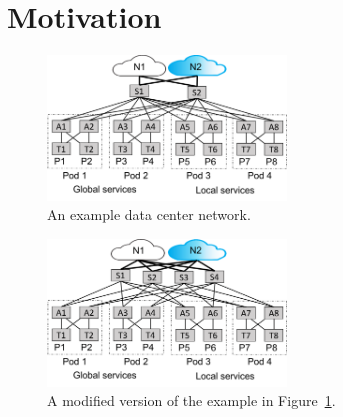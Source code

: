 \documentclass[numbers, 10pt, preprint]{sigplanconf}
\begin{document}




\section{Motivation}
\label{sec:motivation}


\begin{figure}[t!]
  \centering
  \includegraphics[width=2.5in]{figures/example}
  \vspace{-.8em}
  \caption{An example data center network.}
  \label{fig:example}
  \vspace{-.8em}
\end{figure}

\begin{figure}[t!]
  \centering
  \includegraphics[width=2.5in]{figures/example2}
  \vspace{-.8em}
  \caption{A modified version of the example in Figure~\ref{fig:example}.}
  \label{fig:example2}
  \vspace{-.8em}
\end{figure}
\end{document}
